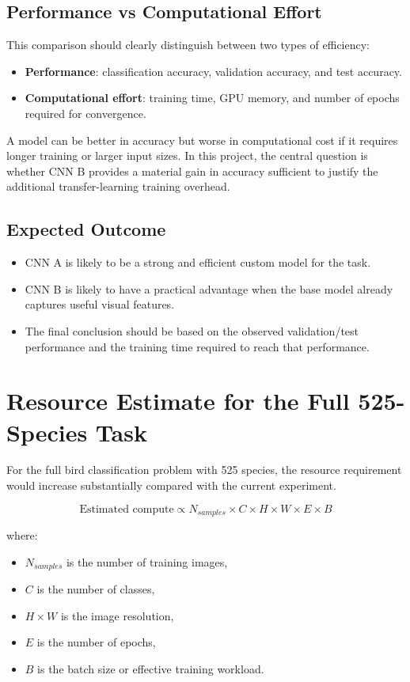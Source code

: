 \documentclass[11pt, a4paper]{report}
\begin{document}
\section{Performance vs Computational Effort}
This comparison should clearly distinguish between two types of efficiency:
\begin{itemize}[leftmargin=1.5em]
    \item \textbf{Performance}: classification accuracy, validation accuracy, and test accuracy.
    \item \textbf{Computational effort}: training time, GPU memory, and number of epochs required for convergence.
\end{itemize}

A model can be better in accuracy but worse in computational cost if it requires longer training or larger input sizes. In this project, the central question is whether CNN B provides a material gain in accuracy sufficient to justify the additional transfer-learning training overhead.

\section{Expected Outcome}
\begin{itemize}[leftmargin=1.5em]
    \item CNN A is likely to be a strong and efficient custom model for the task.
    \item CNN B is likely to have a practical advantage when the base model already captures useful visual features.
    \item The final conclusion should be based on the observed validation/test performance and the training time required to reach that performance.
\end{itemize}

\chapter{Resource Estimate for the Full 525-Species Task}
For the full bird classification problem with 525 species, the resource requirement would increase substantially compared with the current experiment.

\begin{equation}
\text{Estimated compute} \propto N_{samples} \times C \times H \times W \times E \times B
\end{equation}

where:
\begin{itemize}[leftmargin=1.5em]
    \item $N_{samples}$ is the number of training images,
    \item $C$ is the number of classes,
    \item $H \times W$ is the image resolution,
    \item $E$ is the number of epochs,
    \item $B$ is the batch size or effective training workload.
\end{itemize}
\end{document}
